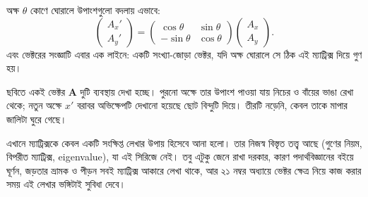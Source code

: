 \documentclass[11pt]{article}
\begin{document}
\begin{idea}[ঘূর্ণন ম্যাট্রিক্স]
অক্ষ $\theta$ কোণে ঘোরালে উপাংশগুলো বদলায় এভাবে:
\[
  \begin{pmatrix} A_{x}' \\ A_{y}' \end{pmatrix}
  = \begin{pmatrix} \cos\theta & \sin\theta \\
  -\sin\theta & \cos\theta \end{pmatrix}
  \begin{pmatrix} A_{x} \\ A_{y} \end{pmatrix} .
\]
এবং ভেক্টরের সংজ্ঞাটি এবার এক লাইনে: একটি সংখ্যা-জোড়া ভেক্টর, যদি অক্ষ
ঘোরালে সে ঠিক এই ম্যাট্রিক্স দিয়ে গুণ হয়।
\end{idea}

\begin{center}
\end{center}

ছবিতে একই ভেক্টর $\mathbf{A}$ দুটি ব্যবস্থায় দেখা হচ্ছে। পুরনো অক্ষে তার
উপাংশ পাওয়া যায় নিচের ও বাঁয়ের ভাঙা রেখা থেকে; নতুন অক্ষে $x'$ বরাবর
অভিক্ষেপটি দেখানো হয়েছে ছোট বিন্দুটি দিয়ে। তীরটি নড়েনি, কেবল তাকে মাপার
জালিটা ঘুরে গেছে।

\begin{remark}
এখানে ম্যাট্রিক্সকে কেবল একটি সংক্ষিপ্ত লেখার উপায় হিসেবে আনা হলো। তার
নিজস্ব বিস্তৃত তত্ত্ব আছে (গুণের নিয়ম, বিপরীত ম্যাট্রিক্স, eigenvalue), যা
এই সিরিজে নেই। তবু এটুকু জেনে রাখা দরকার, কারণ পদার্থবিজ্ঞানের বইয়ে ঘূর্ণন,
জড়তার ভ্রামক ও পীড়ন সবই ম্যাট্রিক্স আকারে লেখা থাকে, আর ২১ নম্বর
অধ্যায়ে ভেক্টর ক্ষেত্র নিয়ে কাজ করার সময় এই লেখার ভঙ্গিটাই সুবিধা দেবে।
\end{remark}
\end{document}
